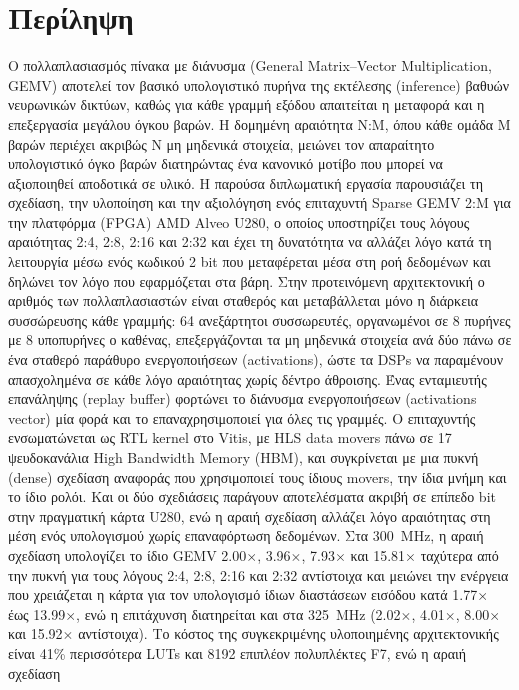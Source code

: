 \documentclass[greek, histinit, english, twosided]{book}
\begin{document}
\setcounter{page}{1}
\pagestyle{empty}
\maketitle

\fancyhf{}
\fancyfoot[C]{\thepage}
\renewcommand{\headrulewidth}{0.4pt}
\renewcommand{\footrulewidth}{0pt}
\fancyhead[LO]{}
\fancyhead[RE]{}
\fancyhead[LE]{\nouppercase\leftmark}
\fancyhead[RO]{\nouppercase\rightmark}

\cleardoublepage
\pagestyle{fancy}
\chapter*{Περίληψη}
\thispagestyle{fancy}

Ο πολλαπλασιασμός πίνακα με διάνυσμα (General Matrix--Vector Multiplication, GEMV) αποτελεί τον βασικό υπολογιστικό πυρήνα της εκτέλεσης (inference) βαθυών νευρωνικών δικτύων, καθώς για κάθε γραμμή εξόδου απαιτείται η μεταφορά και η επεξεργασία μεγάλου όγκου βαρών. Η δομημένη αραιότητα N:M, όπου κάθε ομάδα M βαρών περιέχει ακριβώς N μη μηδενικά στοιχεία, μειώνει τον απαραίτητο υπολογιστικό όγκο βαρών διατηρώντας ένα κανονικό μοτίβο που μπορεί να αξιοποιηθεί αποδοτικά σε υλικό. Η παρούσα διπλωματική εργασία παρουσιάζει τη σχεδίαση, την υλοποίηση και την αξιολόγηση ενός επιταχυντή Sparse GEMV 2:M για την πλατφόρμα (FPGA) AMD Alveo U280, ο οποίος υποστηρίζει τους λόγους αραιότητας 2:4, 2:8, 2:16 και 2:32 και έχει τη δυνατότητα να αλλάζει λόγο κατά τη λειτουργία μέσω ενός κωδικού 2 bit που μεταφέρεται μέσα στη ροή δεδομένων και δηλώνει τον λόγο που εφαρμόζεται στα βάρη. Στην προτεινόμενη αρχιτεκτονική ο αριθμός των πολλαπλασιαστών είναι σταθερός και μεταβάλλεται μόνο η διάρκεια συσσώρευσης κάθε γραμμής: 64 ανεξάρτητοι συσσωρευτές, οργανωμένοι σε 8 πυρήνες με 8 υποπυρήνες ο καθένας, επεξεργάζονται τα μη μηδενικά στοιχεία ανά δύο πάνω σε ένα σταθερό παράθυρο ενεργοποιήσεων (activations), ώστε τα DSPs να παραμένουν απασχολημένα σε κάθε λόγο αραιότητας χωρίς δέντρο άθροισης. Ένας ενταμιευτής επανάληψης (replay buffer) φορτώνει το διάνυσμα ενεργοποιήσεων (activations vector) μία φορά και το επαναχρησιμοποιεί για όλες τις γραμμές. Ο επιταχυντής ενσωματώνεται ως RTL kernel στο Vitis, με HLS data movers πάνω σε 17 ψευδοκανάλια High Bandwidth Memory (HBM), και συγκρίνεται με μια πυκνή (dense) σχεδίαση αναφοράς που χρησιμοποιεί τους ίδιους movers, την ίδια μνήμη και το ίδιο ρολόι. Και οι δύο σχεδιάσεις παράγουν αποτελέσματα ακριβή σε επίπεδο bit στην πραγματική κάρτα U280, ενώ η αραιή σχεδίαση αλλάζει λόγο αραιότητας στη μέση ενός υπολογισμού χωρίς επαναφόρτωση δεδομένων. Στα 300~MHz, η αραιή σχεδίαση υπολογίζει το ίδιο GEMV 2.00$\times$, 3.96$\times$, 7.93$\times$ και 15.81$\times$ ταχύτερα από την πυκνή για τους λόγους 2:4, 2:8, 2:16 και 2:32 αντίστοιχα και μειώνει την ενέργεια που χρειάζεται η κάρτα για τον υπολογισμό ίδιων διαστάσεων εισόδου κατά 1.77$\times$ έως 13.99$\times$, ενώ η επιτάχυνση διατηρείται και στα 325~MHz (2.02$\times$, 4.01$\times$, 8.00$\times$ και 15.92$\times$ αντίστοιχα). Το κόστος της συγκεκριμένης υλοποιημένης αρχιτεκτονικής είναι 41\% περισσότερα LUTs και 8192 επιπλέον πολυπλέκτες F7, ενώ η αραιή σχεδίαση 
\end{document}
